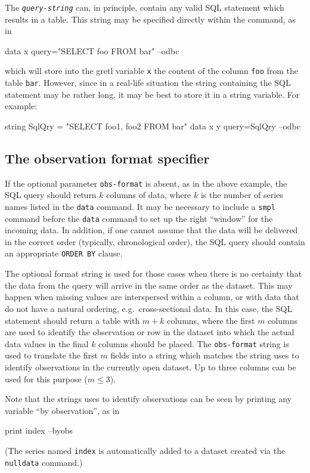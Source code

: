 The \texttt{\emph{query-string}} can, in principle, contain any valid
SQL statement which results in a table. This string may be specified
directly within the command, as in
\begin{code}
  data x query="SELECT foo FROM bar" --odbc
\end{code}
which will store into the gretl variable \texttt{x} the content of the
column \texttt{foo} from the table \texttt{bar}. However, since in a
real-life situation the string containing the SQL statement may be
rather long, it may be best to store it in a string variable.  For
example:
\begin{code}
  string SqlQry = "SELECT foo1, foo2 FROM bar"
  data x y query=SqlQry --odbc
\end{code}

\subsection{The observation format specifier}

If the optional parameter \texttt{obs-format} is absent, as in the
above example, the SQL query should return $k$ columns of data, where
$k$ is the number of series names listed in the \texttt{data} command.
It may be necessary to include a \texttt{smpl} command before the
\texttt{data} command to set up the right ``window'' for the incoming
data.  In addition, if one cannot assume that the data will be
delivered in the correct order (typically, chronological order), the
SQL query should contain an appropriate \texttt{ORDER BY} clause.

The optional format string is used for those cases when there is no
certainty that the data from the query will arrive in the same order
as the  dataset. This may happen when missing values are
interspersed within a column, or with data that do not have a natural
ordering, e.g.\ cross-sectional data. In this case, the SQL statement
should return a table with $m+k$ columns, where the first $m$
columns are used to identify the observation or row in the 
dataset into which the actual data values in the final $k$ columns
should be placed.  The \texttt{obs-format} string is used to translate
the first $m$ fields into a string which matches the string
 uses to identify observations in the currently open
dataset. Up to three columns can be used for this purpose ($m \leq
3$).

Note that the strings  uses to identify observations
can be seen by printing any variable ``by observation'', as in
%
\begin{code}
print index --byobs
\end{code}
%
(The series named \texttt{index} is automatically added to a dataset
created via the \texttt{nulldata} command.)


